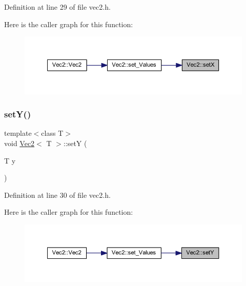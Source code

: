 Definition at line 29 of file vec2.\+h.

Here is the caller graph for this function\+:
\nopagebreak
\begin{figure}[H]
\begin{center}
\leavevmode
\includegraphics[width=350pt]{class_vec2_aec2b21ff78bf3a2e20a044e1ab7d4b53_icgraph}
\end{center}
\end{figure}
\mbox{\label{class_vec2_afb88a3937a78e4d2d7f9031321e6a20b}} 
\subsubsection{\texorpdfstring{setY()}{setY()}}
{\footnotesize\ttfamily template$<$class T$>$ \\
void \mbox{\hyperlink{class_vec2}{Vec2}}$<$ T $>$\+::setY (\begin{DoxyParamCaption}\item[{T}]{y }\end{DoxyParamCaption})\hspace{0.3cm}{\ttfamily [inline]}}



Definition at line 30 of file vec2.\+h.

Here is the caller graph for this function\+:
\nopagebreak
\begin{figure}[H]
\begin{center}
\leavevmode
\includegraphics[width=350pt]{class_vec2_afb88a3937a78e4d2d7f9031321e6a20b_icgraph}
\end{center}
\end{figure}
\mbox{\label{class_vec2_ad3bd967c89cdb49746908d6404759cc5}} 
